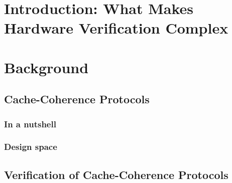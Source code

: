 \chapter{Introduction: What Makes Hardware Verification Complex}

\chapter{Background}

\section{Cache-Coherence Protocols}

\subsection{In a nutshell}

\subsection{Design space}

\section{Verification of Cache-Coherence Protocols}
